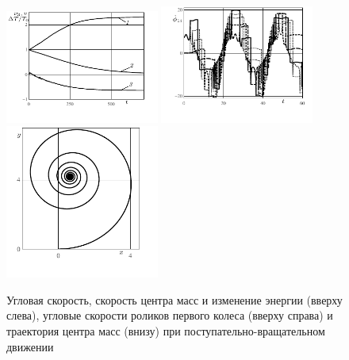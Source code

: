 \begin{figure}[h]
  \begin{center}
  \includegraphics[width=0.45\textwidth]{pic/figure7_1.pdf}
  \includegraphics[width=0.45\textwidth]{pic/figure7_2.pdf}
  \includegraphics[width=0.45\textwidth]{pic/figure7_3.pdf}
  \end{center}
  \caption{Угловая скорость, скорость центра масс и изменение энергии (вверху слева), угловые скорости роликов первого колеса (вверху справа) и траектория центра масс (внизу) при поступательно-вращательном движении}\label{fig:wrench}
\end{figure}


%

%

%